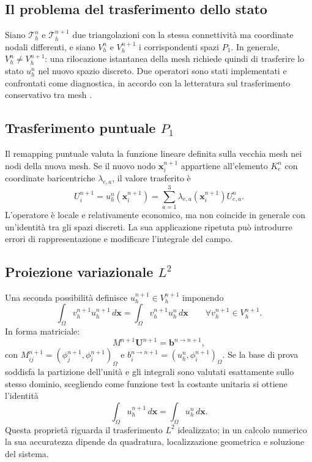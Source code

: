 \subsection{Il problema del trasferimento dello stato}

Siano $\mathcal T_h^n$ e $\mathcal T_h^{n+1}$ due triangolazioni con la stessa connettività ma coordinate nodali differenti, e siano $V_h^n$ e $V_h^{n+1}$ i corrispondenti spazi $P_1$. In generale, $V_h^n\neq V_h^{n+1}$: una rilocazione istantanea della mesh richiede quindi di trasferire lo stato $u_h^n$ nel nuovo spazio discreto. Due operatori sono stati implementati e confrontati come diagnostica, in accordo con la letteratura sul trasferimento conservativo tra mesh \citep{zzhang2006moving,alauzet2010p1}.

\subsection{Trasferimento puntuale \texorpdfstring{$P_1$}{P1}}

Il remapping puntuale valuta la funzione lineare definita sulla vecchia mesh nei nodi della nuova mesh. Se il nuovo nodo $\bm x_i^{n+1}$ appartiene all'elemento $K_e^n$ con coordinate baricentriche $\lambda_{e,a}$, il valore trasferito è
\begin{equation}
U_i^{n+1}=
u_h^n(\bm x_i^{n+1})
=\sum_{a=1}^{3}\lambda_{e,a}(\bm x_i^{n+1})U_{e,a}^n.
\label{eq:p1_remap}
\end{equation}
L'operatore è locale e relativamente economico, ma non coincide in generale con un'identità tra gli spazi discreti. La sua applicazione ripetuta può introdurre errori di rappresentazione e modificare l'integrale del campo.

\subsection{Proiezione variazionale \texorpdfstring{$L^2$}{L2}}

Una seconda possibilità definisce $u_h^{n+1}\in V_h^{n+1}$ imponendo
\begin{equation}
\int_\Omega v_h^{n+1}u_h^{n+1}\,d\bm x
=
\int_\Omega v_h^{n+1}u_h^n\,d\bm x
\qquad \forall v_h^{n+1}\in V_h^{n+1}.
\label{eq:l2_projection}
\end{equation}
In forma matriciale:
\begin{equation}
M^{n+1}\bm U^{n+1}=\bm b^{n\rightarrow n+1},
\end{equation}
con $M_{ij}^{n+1}=(\phi_j^{n+1},\phi_i^{n+1})_\Omega$ e
$b_i^{n\rightarrow n+1}=(u_h^n,\phi_i^{n+1})_\Omega$. Se la base di prova soddisfa la partizione dell'unità e gli integrali sono valutati esattamente sullo stesso dominio, scegliendo come funzione test la costante unitaria si ottiene l'identità
\begin{equation}
\int_\Omega u_h^{n+1}\,d\bm x=\int_\Omega u_h^n\,d\bm x.
\label{eq:l2_integral}
\end{equation}
Questa proprietà riguarda il trasferimento $L^2$ idealizzato; in un calcolo numerico la sua accuratezza dipende da quadratura, localizzazione geometrica e soluzione del sistema.

